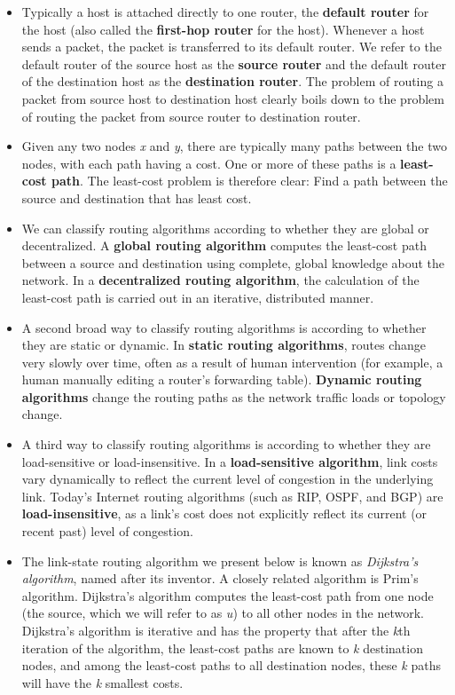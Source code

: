 \begin{itemize}
\item
Typically a host is attached directly to one router, the \textbf{default router} for the host (also called the \textbf{first-hop router} for the host). Whenever a host sends a packet, the packet is transferred to its default router. We refer to the default router of the source host as the \textbf{source router} and the default router of the destination host as the \textbf{destination router}. The problem of routing a packet from source host to destination host clearly boils down to the problem of routing the packet from source router to destination router.

\item
Given any two nodes \textit{x} and \textit{y}, there are typically many paths between the two nodes, with each path having a cost. One or more of these paths is a \textbf{least-cost path}. The least-cost problem is therefore clear: Find a path between the source and destination that has least cost.

\item
We can classify routing algorithms according to whether they are global or decentralized. A \textbf{global routing algorithm} computes the least-cost path between a source and destination using complete, global knowledge about the network. In a \textbf{decentralized routing algorithm}, the calculation of the least-cost path is carried out in an iterative, distributed manner.


\item
A second broad way to classify routing algorithms is according to whether they are static or dynamic. In \textbf{static routing algorithms}, routes change very slowly over time, often as a result of human intervention (for example, a human manually editing a router's forwarding table). \textbf{Dynamic routing algorithms} change the routing paths as the network traffic loads or topology change.

\item
A third way to classify routing algorithms is according to whether they are load-sensitive or load-insensitive. In a \textbf{load-sensitive algorithm}, link costs vary dynamically to reflect the current level of congestion in the underlying link. Today's Internet routing algorithms (such as RIP, OSPF, and BGP) are \textbf{load-insensitive}, as a link's cost does not explicitly reflect its current (or recent past) level of congestion.

\item
The link-state routing algorithm we present below is known as \textit{Dijkstra's algorithm}, named after its inventor. A closely related algorithm is Prim's algorithm. Dijkstra's algorithm computes the least-cost path from one node (the source, which we will refer to as \textit{u}) to all other nodes in the network. Dijkstra's algorithm is iterative and has the property that after the \textit{k}th iteration of the algorithm, the least-cost paths are known to \textit{k} destination nodes, and among the least-cost paths to all destination nodes, these \textit{k} paths will have the \textit{k} smallest costs.


\end{itemize}
